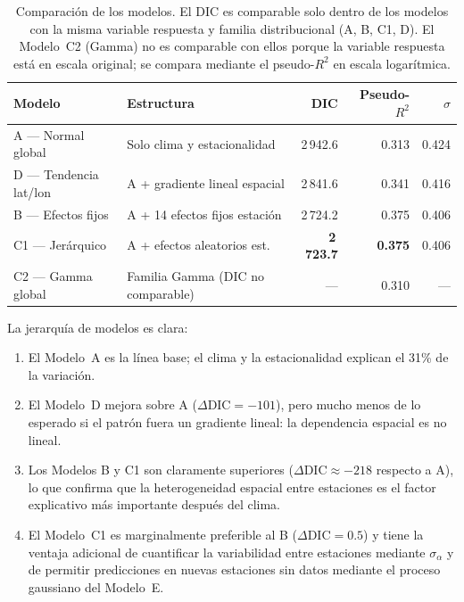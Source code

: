 ﻿\documentclass[12pt]{article}
\begin{document}
\begin{table}[H]
\centering
\caption{Comparaci\'on de los modelos.
         El DIC es comparable solo dentro de los modelos con la misma
         variable respuesta y familia distribucional (A, B, C1, D).
         El Modelo~C2 (Gamma) no es comparable con ellos porque la
         variable respuesta est\'a en escala original; se compara mediante
         el pseudo-$R^2$ en escala logar\'itmica.}
\label{tab:comparacion}
\small
\begin{tabular}{>{\raggedright\arraybackslash}p{3.5cm}>{\raggedright\arraybackslash}p{5cm}rrr}
\toprule
Modelo & Estructura & DIC & Pseudo-$R^2$ & $\sigma$ \\
\midrule
A --- Normal global     & Solo clima y estacionalidad      & 2\,942.6 & 0.313 & 0.424 \\
D --- Tendencia lat/lon & A + gradiente lineal espacial    & 2\,841.6 & 0.341 & 0.416 \\
B --- Efectos fijos     & A + 14 efectos fijos estaci\'on  & 2\,724.2 & 0.375 & 0.406 \\
C1 --- Jer\'arquico     & A + efectos aleatorios est.      & \textbf{2\,723.7} & \textbf{0.375} & 0.406 \\
\midrule
C2 --- Gamma global     & Familia Gamma (DIC no comparable)& ---  & 0.310 & --- \\
\bottomrule
\end{tabular}
\normalsize
\end{table}

La jerarqu\'ia de modelos es clara:
\begin{enumerate}
  \item El Modelo~A es la l\'inea base; el clima y la estacionalidad
        explican el 31\% de la variaci\'on.
  \item El Modelo~D mejora sobre A ($\Delta\text{DIC} = -101$), pero
        mucho menos de lo esperado si el patr\'on fuera un gradiente
        lineal: la dependencia espacial es no lineal.
  \item Los Modelos B y C1 son claramente superiores
        ($\Delta\text{DIC} \approx -218$ respecto a A), lo que confirma
        que la heterogeneidad espacial entre estaciones es
        el factor explicativo m\'as importante despu\'es del clima.
  \item El Modelo~C1 es marginalmente preferible al B
        ($\Delta\text{DIC} = 0.5$) y tiene la ventaja adicional de
        cuantificar la variabilidad entre estaciones mediante $\sigma_\alpha$
        y de permitir predicciones en nuevas estaciones sin datos mediante
        el proceso gaussiano del Modelo~E.
\end{enumerate}
\end{document}

